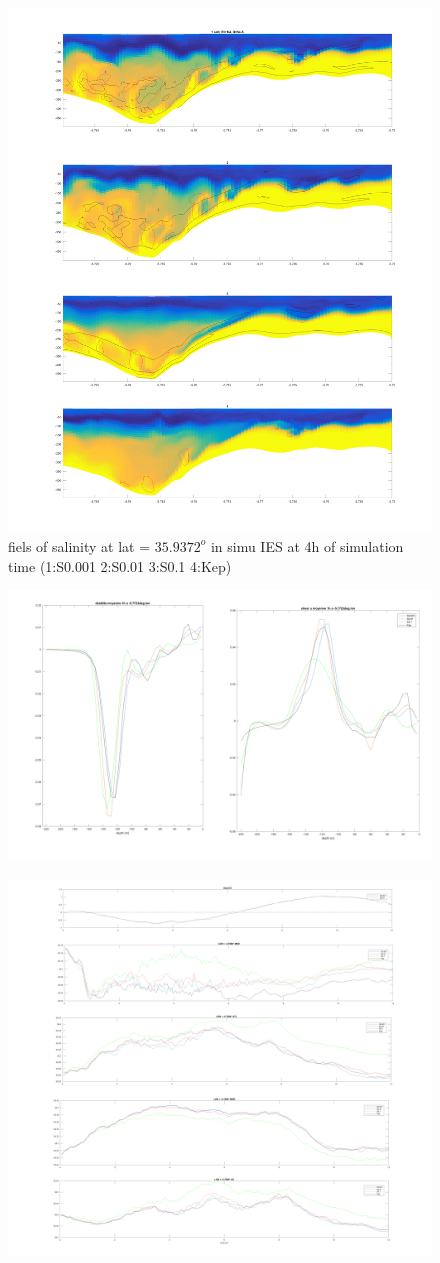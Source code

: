 \begin{figure}[!h]
 \includegraphics[width=.7\textwidth]{./GBR3D/CoupesSsmago.png}
 \caption {fiels of salinity at lat = $35.9372^o$ in simu IES at 4h of simulation time  (1:S0.001  2:S0.01  3:S0.1 4:Kep)}
\end{figure}
\begin{figure}[!h]
 \includegraphics[width=.5\textwidth]{./GBR3D/Avg_dsdz_dudz_smago.png}
\end{figure}
\begin{figure}[!h]
 \includegraphics[width=.5\textwidth]{./GBR3D/Smoy_ouest-est_Atl-Med_smago.png}
\end{figure}

